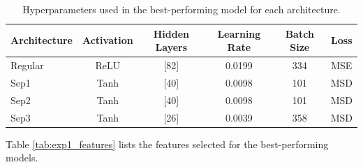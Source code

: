 \begin{table}[!htbp]
    \centering
    \caption{Hyperparameters used in the best-performing model for each architecture.}
    \begin{tabular}{lccccc}
        \toprule
        Architecture & Activation & Hidden Layers & Learning Rate & Batch Size & Loss \\
        \midrule
        Regular &  ReLU & [82] & 0.0199 & 334 & MSE \\
        Sep1    &  Tanh & [40] & 0.0098 & 101 & MSD \\
        Sep2    &  Tanh & [40] & 0.0098 & 101 & MSD \\
        Sep3    &  Tanh & [26] & 0.0039 & 358 & MSD \\
        \bottomrule
    \end{tabular}
    \label{tab:exp1_hyperparameters_best_model}
\end{table}



Table \ref{tab:exp1_features} lists the features selected for the best-performing models.


